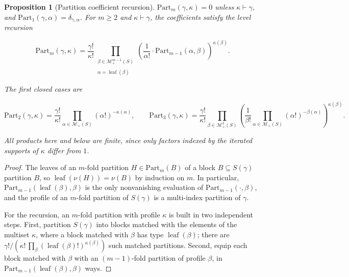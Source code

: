 \documentclass[10pt,a4paper]{article}
\theoremstyle{plain}
\newtheorem{proposition}[theorem]{Proposition}
\theoremstyle{definition}
\newcommand{\1}{\mathbb{1}} %
\newcommand{\KM}{\mathcal{M}} %
\newcommand{\Part}{\mathrm{Part}} %
\DeclareMathOperator{\lf}{\mathrm{leaf}} %
\begin{document}
\begin{proposition}[Partition coefficient recursion]

\label{prop:poly-partition-recursion} \(\Part_m(\gamma, \kappa) = 0\)
unless \(\kappa \vdash \gamma\), and
\(\Part_1(\gamma, \alpha) = \delta_{\gamma, \alpha}\). For \(m \geq 2\)
and \(\kappa \vdash \gamma\), the coefficients satisfy the level
recursion

\[
  \Part_m(\gamma, \kappa) = \frac{\gamma!}{\kappa!} \prod_{\substack{\beta \in \KM_+^{m-1}(S) \\\\ \alpha = \lf(\beta)}}
  \left(
    \frac{1}{\alpha!} \cdot \Part_{m-1}(\alpha, \beta)
  \right)^{\kappa(\beta)}.
\]

The first closed cases are

\[
  \Part_2(\gamma, \kappa) = \frac{\gamma!}{\kappa!} \prod_{\alpha \in \KM_+(S)} (\alpha!)^{-\kappa(\alpha)}, \qquad 
  \Part_3(\gamma, \kappa) = \frac{\gamma!}{\kappa!} \prod_{\beta \in \KM_+^2(S)}
  \left(
    \frac{1}{\beta!} \prod_{\alpha \in \KM_+(S)}  (\alpha!)^{-\beta(\alpha)}
  \right)^{\kappa(\beta)}.
\]

All products here and below are finite, since only factors indexed by
the iterated supports of \(\kappa\) differ from \(1\).

\end{proposition}

\begin{proof}

The leaves of an \(m\)-fold partition \(H \in \Part_m(B)\) of a block
\(B \subseteq S(\gamma)\) partition \(B\), so \(\lf(\nu(H)) = \nu(B)\)
by induction on \(m\). In particular, \(\Part_{m-1}(\lf(\beta), \beta)\)
is the only nonvanishing evaluation of \(\Part_{m-1}(\cdot, \beta)\),
and the profile of an \(m\)-fold partition of \(S(\gamma)\) is a
multi-index partition of \(\gamma\).

For the recursion, an \(m\)-fold partition with profile \(\kappa\) is
built in two independent steps. First, partition \(S(\gamma)\) into
blocks matched with the elements of the multiset \(\kappa\), where a
block matched with \(\beta\) has type \(\lf(\beta)\); there are
\(\gamma! / (\kappa!\, \prod_\beta (\lf(\beta)!)^{\kappa(\beta)})\) such
matched partitions. Second, equip each block matched with \(\beta\) with
an \((m{-}1)\)-fold partition of profile \(\beta\), in
\(\Part_{m-1}(\lf(\beta), \beta)\) ways.

\end{proof}
\end{document}
